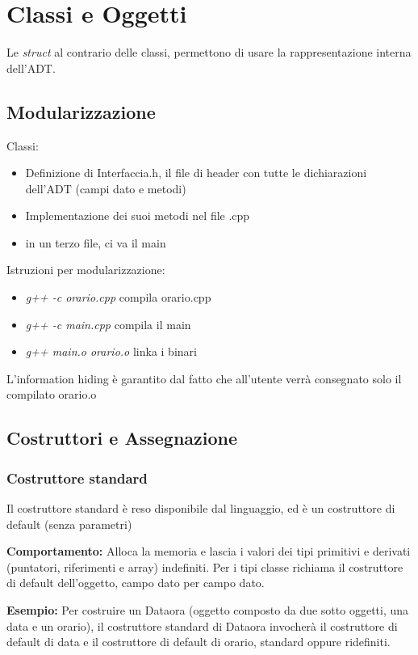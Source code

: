 \chapter{Classi e Oggetti}

Le \textit{struct} al contrario delle classi, permettono di usare la rappresentazione interna dell'ADT.

\section{Modularizzazione}
Classi:
\begin{itemize}
\item Definizione di Interfaccia.h, il file di header con tutte le dichiarazioni dell'ADT (campi dato e metodi)
\item Implementazione dei suoi metodi nel file .cpp
\item in un terzo file, ci va il main
\end{itemize}

Istruzioni per modularizzazione:
\begin{itemize}
	\item \textit{g++ -c orario.cpp} compila orario.cpp
	\item \textit{g++ -c main.cpp} compila il main
	\item \textit{g++ main.o orario.o} linka i binari 
\end{itemize}

L'information hiding è garantito dal fatto che all'utente verrà consegnato solo il compilato orario.o 

\section{Costruttori e Assegnazione}

\subsection{Costruttore standard}
Il costruttore standard è reso disponibile dal linguaggio, ed è un costruttore di default (senza parametri)

\textbf{Comportamento:} Alloca la memoria e lascia i valori dei tipi primitivi e derivati (puntatori, riferimenti e array) indefiniti. Per i tipi classe richiama il costruttore di default dell'oggetto, campo dato per campo dato.

\textbf{Esempio:} Per costruire un Dataora (oggetto composto da due sotto oggetti, una data e un orario), il costruttore standard di Dataora invocherà il costruttore di default di data e il costruttore di default di orario, standard oppure ridefiniti. 

